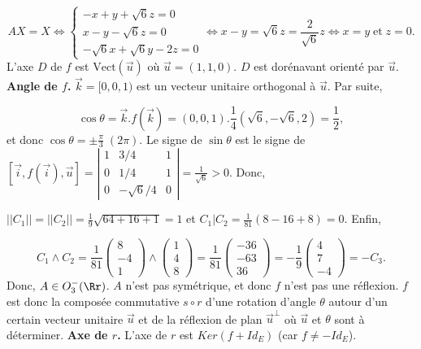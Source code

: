 {{$$AX=X\Leftrightarrow\left\{
\begin{array}{l}
-x+y+\sqrt{6}z=0\\
x-y-\sqrt{6}z=0\\
-\sqrt{6}x+\sqrt{6}y-2z=0
\end{array}
\right.\Leftrightarrow x-y=\sqrt{6}z=\frac{2}{\sqrt{6}}z\Leftrightarrow x=y\;\mbox{et}\;z=0.$$ 
L'axe $D$ de $f$ est $\mbox{Vect}(\overrightarrow{u})$ où $\overrightarrow{u}=(1,1,0)$. $D$ est dorénavant orienté par $\overrightarrow{u}$.
\textbf{Angle de $f$.} $\overrightarrow{k}=[0,0,1)$ est un vecteur unitaire orthogonal à $\overrightarrow{u}$. Par suite,

$$\cos\theta=\overrightarrow{k}.f(\overrightarrow{k})=(0,0,1).\frac{1}{4}(\sqrt{6},-\sqrt{6},2)=\frac{1}{2},$$
et donc $\cos\theta=\pm\frac{\pi}{3}\;(2\pi)$. Le signe de $\sin\theta$ est le signe de $\left[\overrightarrow{i},f(\overrightarrow{i}),\overrightarrow{u}\right]
=\left|
\begin{array}{ccc}
1&3/4&1\\
0&1/4&1\\
0&-\sqrt{6}/4&0
\end{array}
\right|=\frac{1}{\sqrt{6}}>0$. Donc, 

\begin{center}
\end{center}
$||C_1||=||C_2||=\frac{1}{9}\sqrt{64+16+1}=1$ et $C_1|C_2=\frac{1}{81}(8-16+8)=0$. Enfin,

$$C_1\wedge C_2=\frac{1}{81}\left(
\begin{array}{c}
8\\
-4\\
1
\end{array}
\right)\wedge\left(
\begin{array}{c}
1\\
4\\
8
\end{array}
\right)=\frac{1}{81}\left(
\begin{array}{c}
-36\\
-63\\
36
\end{array}
\right)=-\frac{1}{9}\left(
\begin{array}{c}
4\\
7\\
-4
\end{array}
\right)=-C_3.$$
Donc, $A\in O_3^-(\Rr)$. $A$ n'est pas symétrique, et donc $f$ n'est pas une réflexion. $f$ est donc la composée commutative $s\circ r$ d'une rotation d'angle $\theta$ autour d'un certain vecteur unitaire $\overrightarrow{u}$ et de la réflexion de plan $\overrightarrow{u}^\bot$ où $\overrightarrow{u}$ et $\theta$ sont à déterminer.
\textbf{Axe de $r$.} L'axe de $r$ est $Ker(f+Id_E)$ (car $f\neq-Id_E$).

}}
